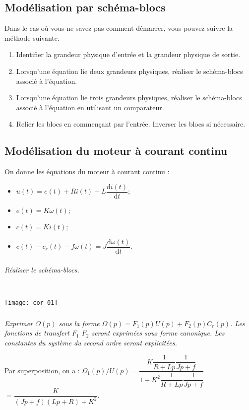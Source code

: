 \ifprof
\else
\begin{multicols}{2}
\fi
\section*{Modélisation par schéma-blocs}

\begin{methode}
Dans le cas où vous ne savez pas comment démarrer, vous pouvez suivre la méthode suivante.
\begin{enumerate}
\item Identifier la grandeur physique d'entrée et la grandeur physique de sortie.
\item Lorsqu'une équation lie deux grandeurs physiques, réaliser le schéma-blocs associé à l'équation. 
\item Lorsqu'une équation lie trois grandeurs physiques, réaliser le schéma-blocs associé à l'équation en utilisant un comparateur.
\item Relier les blocs en commençant par l'entrée. Inverser les blocs si nécessaire.
\end{enumerate}
\end{methode}
\subsection*{Modélisation du moteur à courant continu}

\ifprof
\else
On donne les équations du moteur à courant continu :
\begin{itemize}
\item $u(t) = e(t)+ Ri(t) +L \dfrac{\text{d}i(t)}{\text{d} t}$;
\item $e(t)=K\omega(t)$;
\item $c(t)=Ki(t)$;
\item $c(t)-c_r(t) - f\omega(t)=J\dfrac{\text{d}\omega(t)}{\text{d} t}$.
\end{itemize}
\fi

\subparagraph{}
\textit{Réaliser le schéma-blocs.}

\ifprof
\begin{corrige}~\\
\begin{center}
\texttt{[image: cor\_01]}
\end{center}
\end{corrige}
\else
\fi

\subparagraph{}
\textit{Exprimer $\Omega(p)$ sous la forme  $\Omega(p)=F_1(p)U(p) + F_2(p) C_r(p)$. Les fonctions de transfert $F_1$ $F_2$ seront exprimées sous forme canonique. Les constantes du système du second ordre seront explicitées.}
\ifprof
\begin{corrige}
Par superposition, on a : 
$\Omega_1(p)/U(p)=\dfrac{K\dfrac{1}{R+Lp}\dfrac{1}{Jp+f}}{1+K^2\dfrac{1}{R+Lp}\dfrac{1}{Jp+f}}$
$=\dfrac{K}{\left(Jp+f\right)\left(Lp+R\right)+K^2}$.


\end{corrige}
\end{multicols}
